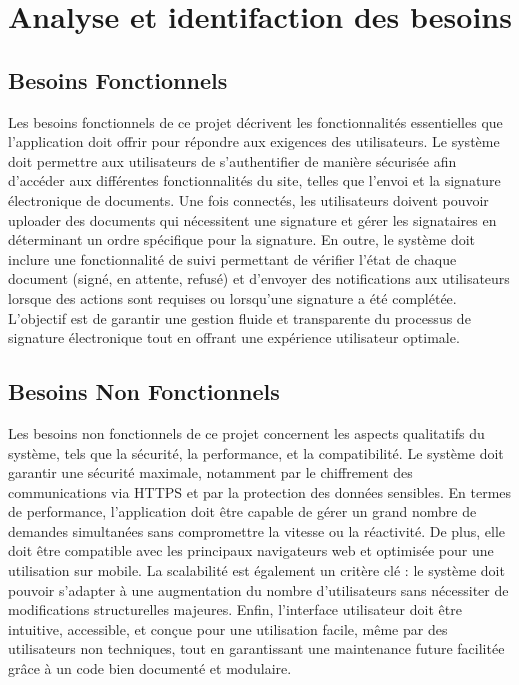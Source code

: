\section{Analyse et identifaction des besoins}
\subsection{Besoins Fonctionnels}

Les besoins fonctionnels de ce projet décrivent les fonctionnalités essentielles que l'application doit offrir pour répondre aux exigences des utilisateurs. Le système doit permettre aux utilisateurs de s'authentifier de manière sécurisée afin d'accéder aux différentes fonctionnalités du site, telles que l'envoi et la signature électronique de documents. Une fois connectés, les utilisateurs doivent pouvoir uploader des documents qui nécessitent une signature et gérer les signataires en déterminant un ordre spécifique pour la signature. En outre, le système doit inclure une fonctionnalité de suivi permettant de vérifier l'état de chaque document (signé, en attente, refusé) et d'envoyer des notifications aux utilisateurs lorsque des actions sont requises ou lorsqu'une signature a été complétée. L'objectif est de garantir une gestion fluide et transparente du processus de signature électronique tout en offrant une expérience utilisateur optimale.





\subsection{Besoins Non Fonctionnels}

Les besoins non fonctionnels de ce projet concernent les aspects qualitatifs du système, tels que la sécurité, la performance, et la compatibilité. Le système doit garantir une sécurité maximale, notamment par le chiffrement des communications via HTTPS et par la protection des données sensibles. En termes de performance, l'application doit être capable de gérer un grand nombre de demandes simultanées sans compromettre la vitesse ou la réactivité. De plus, elle doit être compatible avec les principaux navigateurs web et optimisée pour une utilisation sur mobile. La scalabilité est également un critère clé : le système doit pouvoir s'adapter à une augmentation du nombre d'utilisateurs sans nécessiter de modifications structurelles majeures. Enfin, l'interface utilisateur doit être intuitive, accessible, et conçue pour une utilisation facile, même par des utilisateurs non techniques, tout en garantissant une maintenance future facilitée grâce à un code bien documenté et modulaire.





